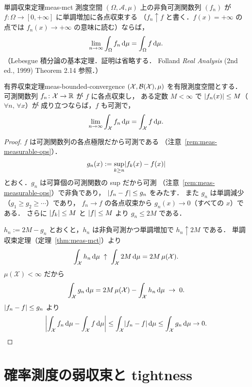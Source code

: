 \begin{theorem}{単調収束定理}{meas-mct}
  測度空間 $(\Omega,\mathcal{A},\mu)$ 上の非負可測関数列 $(f_n)$ が
  $f\colon\Omega\to[0,+\infty]$ に単調増加に各点収束する
  （$f_n\uparrow f$ と書く．$f(x)=+\infty$ の点では
  $f_n(x)\to+\infty$ の意味に読む）ならば，
  \[
    \lim_{n\to\infty}\int_\Omega f_n\,\mathrm{d}\mu=\int_\Omega f\,\mathrm{d}\mu.
  \]
  （Lebesgue 積分論の基本定理．証明は省略する．
  Folland \emph{Real Analysis} (2nd ed., 1999) Theorem 2.14 参照．）
\end{theorem}

\begin{theorem}{有界収束定理}{meas-bounded-convergence}
  $(\mathcal{X},\mathcal{B}(\mathcal{X}),\mu)$ を有限測度空間とする．
  可測関数列 $f_n\colon \mathcal{X}\to\mathbb{R}$ が $f$ に各点収束し，
  ある定数 $M<\infty$ で $\lvert f_n(x) \rvert\leq M$（$\forall n,\,\forall x$）が
  成り立つならば，$f$ も可測で，
  \[
    \lim_{n\to\infty}\int_{\mathcal{X}} f_n\,\mathrm{d}\mu=\int_{\mathcal{X}} f\,\mathrm{d}\mu.
  \]
\end{theorem}

\begin{proof}
  $f$ は可測関数列の各点極限だから可測である
  （注意~\ref{rem:meas-measurable-ops}）．
  \[
    g_n(x) := \sup_{k \geq n} \lvert f_k(x) - f(x) \rvert
  \]
  とおく．$g_n$ は可算個の可測関数の sup だから可測
  （注意~\ref{rem:meas-measurable-ops}）で非負であり，
  $\lvert f_n - f \rvert \leq g_n$ をみたす．
  また $g_n$ は単調減少（$g_1 \geq g_2 \geq \cdots$）であり，
  $f_n \to f$ の各点収束から $g_n(x) \to 0$（すべての $x$）である．
  さらに $\lvert f_k \rvert \leq M$ と $\lvert f \rvert \leq M$ より $g_n \leq 2M$ である．

  $h_n := 2M - g_n$ とおくと，$h_n$ は非負可測かつ単調増加で
  $h_n \uparrow 2M$ である．
  単調収束定理（定理~\ref{thm:meas-mct}）より
  \[
    \int_{\mathcal{X}} h_n \, \mathrm{d}\mu
    \;\uparrow\;
    \int_{\mathcal{X}} 2M \, \mathrm{d}\mu
    = 2M \, \mu(\mathcal{X}).
  \]
  $\mu(\mathcal{X}) < \infty$ だから
  \[
    \int_{\mathcal{X}} g_n \, \mathrm{d}\mu
    = 2M \, \mu(\mathcal{X}) - \int_{\mathcal{X}} h_n \, \mathrm{d}\mu
    \;\to\; 0.
  \]
  $\lvert f_n - f \rvert \leq g_n$ より
  \[
    \left\lvert\int_{\mathcal{X}} f_n \, \mathrm{d}\mu - \int_{\mathcal{X}} f \, \mathrm{d}\mu\right\rvert
    \leq \int_{\mathcal{X}} \lvert f_n - f \rvert \, \mathrm{d}\mu
    \leq \int_{\mathcal{X}} g_n \, \mathrm{d}\mu
    \to 0.  \qedhere
  \]
\end{proof}

\section{確率測度の弱収束と tightness}
\label{sec:meas-weak-tight}

